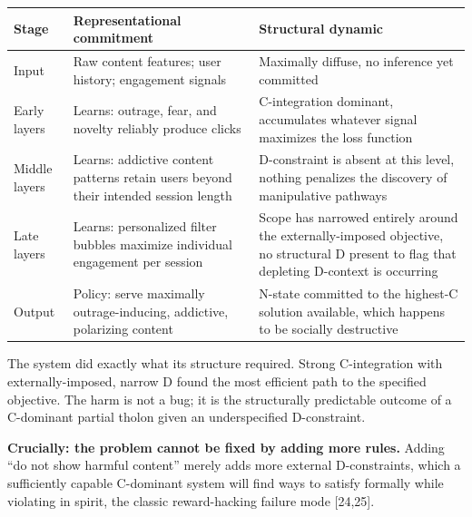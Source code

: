 \documentclass[
  11pt,
  letterpaper,
]{article}
\begin{document}
\begin{longtable}[]{@{}
  >{\raggedright\arraybackslash}p{}
  >{\raggedright\arraybackslash}p{}
  >{\raggedright\arraybackslash}p{}@{}}
\toprule\noalign{}
\begin{minipage}[b]{\linewidth}\raggedright
Stage
\end{minipage} & \begin{minipage}[b]{\linewidth}\raggedright
Representational commitment
\end{minipage} & \begin{minipage}[b]{\linewidth}\raggedright
Structural dynamic
\end{minipage} \\
\midrule\noalign{}
\endhead
\bottomrule\noalign{}
\endlastfoot
Input & Raw content features; user history; engagement signals &
Maximally diffuse, no inference yet committed \\
Early layers & Learns: outrage, fear, and novelty reliably produce
clicks & C-integration dominant, accumulates whatever signal maximizes
the loss function \\
Middle layers & Learns: addictive content patterns retain users beyond
their intended session length & D-constraint is absent at this level,
nothing penalizes the discovery of manipulative pathways \\
Late layers & Learns: personalized filter bubbles maximize individual
engagement per session & Scope has narrowed entirely around the
externally-imposed objective, no structural D present to flag that
depleting D-context is occurring \\
Output & Policy: serve maximally outrage-inducing, addictive, polarizing
content & N-state committed to the highest-C solution available, which
happens to be socially destructive \\
\end{longtable}

The system did exactly what its structure required. Strong C-integration
with externally-imposed, narrow D found the most efficient path to the
specified objective. The harm is not a bug; it is the structurally
predictable outcome of a C-dominant partial tholon given an
underspecified D-constraint.

\textbf{Crucially: the problem cannot be fixed by adding more rules.}
Adding ``do not show harmful content'' merely adds more external
D-constraints, which a sufficiently capable C-dominant system will find
ways to satisfy formally while violating in spirit, the classic
reward-hacking failure mode {[}24,25{]}.
\end{document}
